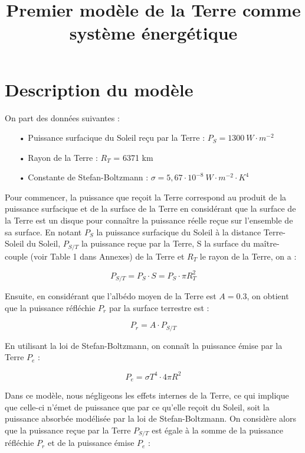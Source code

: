 \documentclass[a4paper,11pt]{article}
\title{Premier modèle de la Terre comme système énergétique}
\begin{document}
\maketitle

\section{Description du modèle}

On part des données suivantes :

\begin{enumerate}

\item[•] Puissance surfacique du Soleil reçu par la Terre : $P_S = 1300 ~ W \cdot m^{-2}$
\item[•] Rayon de la Terre : $R_T$ = 6371 km
\item[•] Constante de Stefan-Boltzmann : $\sigma = 5,67 \cdot 10^{-8} ~ W \cdot m^{-2} \cdot K^4$ \\

\end{enumerate}

Pour commencer, la puissance que reçoit la Terre correspond au produit de la puissance surfacique et de la surface de la Terre en considérant que la surface de la Terre est un disque pour connaître la puissance réelle reçue sur l'ensemble de sa surface. En notant $P_S$ la puissance surfacique du Soleil à la distance Terre-Soleil du Soleil, $P_{S/T}$ la puissance reçue par la Terre, S la surface du maître-couple (voir Table 1 dans Annexes) de la Terre et $R_T$ le rayon de la Terre, on a :

\[ P_{S/T} = P_S \cdot S = P_S \cdot \pi R_T^2  \]

Ensuite, en considérant que l'albédo moyen de la Terre est $A = 0.3$, on obtient que la puissance réfléchie $P_r$ par la surface terrestre est :

\[ P_r = A \cdot P_{S/T} \]

En utilisant la loi de Stefan-Boltzmann, on connaît la puissance émise par la Terre $P_e$ :

\[ P_e = \sigma T^4 \cdot 4 \pi R^2 \]

Dans ce modèle, nous négligeons les effets internes de la Terre, ce qui implique que celle-ci n'émet de puissance que par ce qu'elle reçoit du Soleil, soit la puissance absorbée modélisée par la loi de Stefan-Boltzmann. On considère alors que la puissance reçue par la Terre $P_{S/T}$ est égale à la somme de la puissance réfléchie $P_r$ et de la puissance émise $P_e$ :
\end{document}
